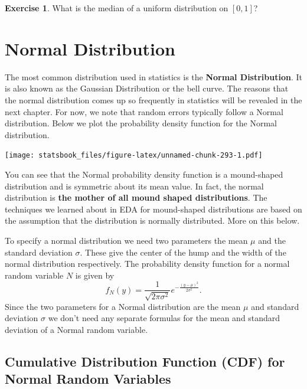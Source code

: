\documentclass[
]{book}
\theoremstyle{definition}
\theoremstyle{definition}
\theoremstyle{definition}
\newtheorem{exercise}{Exercise}[chapter]
\theoremstyle{definition}
\theoremstyle{remark}
\begin{document}
\begin{exercise}
\protect\hypertarget{exr:unnamed-chunk-292}{}\label{exr:unnamed-chunk-292}What is the median of a uniform distribution on \([0,1]\)?
\end{exercise}

\hypertarget{normal-distribution}{%
\section{Normal Distribution}\label{normal-distribution}}

The most common distribution used in statistics is the \textbf{Normal Distribution}. It is also known as the Gaussian Distribution or the bell curve. The reasons that the normal distribution comes up so frequently in statistics will be revealed in the next chapter. For now, we note that random errors typically follow a Normal distribution. Below we plot the probability density function for the Normal distribution.

\texttt{[image: statsbook\_files/figure-latex/unnamed-chunk-293-1.pdf]}

You can see that the Normal probability density function is a mound-shaped distribution and is symmetric about its mean value. In fact, the normal distribution is \textbf{the mother of all mound shaped distributions}. The techniques we learned about in EDA for mound-shaped distributions are based on the assumption that the distribution is normally distributed. More on this below.

To specify a normal distribution we need two parameters the mean \(\mu\) and the standard deviation \(\sigma\). These give the center of the hump and the width of the normal distribution respectively. The probability density function for a normal random variable \(N\) is given by \[f_N(y)=\frac{1}{\sqrt{2\pi \sigma^2}} e^{-\frac{(y-\mu)^2}{2\sigma^2}}.\]
Since the two parameters for a Normal distribution are the mean \(\mu\) and standard deviation \(\sigma\) we don't need any separate formulas for the mean and standard deviation of a Normal random variable.

\hypertarget{cumulative-distribution-function-cdf-for-normal-random-variables}{%
\subsection{Cumulative Distribution Function (CDF) for Normal Random Variables}\label{cumulative-distribution-function-cdf-for-normal-random-variables}}
\end{document}
